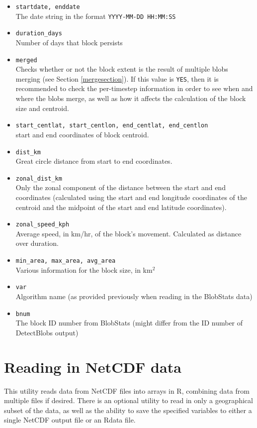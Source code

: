 \documentclass{article}
\begin{document}
\begin{itemize}
\item[]\texttt{startdate, enddate}\\The date string in the format \texttt{YYYY-MM-DD HH:MM:SS}
\item[] \texttt{duration\_days}\\ Number of days that block persists
\item[] \texttt{merged}\\ Checks whether or not the block extent is the result of multiple blobs merging (see Section \ref{mergesection}). If this value is \texttt{YES}, then it is recommended to check the per-timestep information in order to see when and where the blobs merge, as well as how it affects the calculation of the block size and centroid.
\item[] \texttt{start\_centlat, start\_centlon, end\_centlat, end\_centlon}\\ start and end coordinates of block centroid.
\item[] \texttt{dist\_km}\\ Great circle distance from start to end coordinates.
\item[] \texttt{zonal\_dist\_km} \\ Only the zonal component of the distance between the start and end coordinates (calculated using the start and end longitude coordinates of the centroid and the midpoint of the start and end latitude coordinates).
\item[] \texttt{zonal\_speed\_kph} \\Average speed, in km/hr, of the block's movement. Calculated as distance over duration.
\item[] \texttt{min\_area, max\_area, avg\_area} \\ Various information for the block size, in km$^2$
\item[] \texttt{var}\\Algorithm name (as provided previously when reading in the BlobStats data)
\item[] \texttt{bnum}\\ The block ID number from BlobStats (might differ from the ID number of DetectBlobs output)
\end{itemize}


\section{Reading in NetCDF data}

This utility reads data from NetCDF files into arrays in R, combining data from multiple files if desired. There is an optional utility to read in only a geographical subset of the data, as well as the ability to save the specified variables to either a single NetCDF output file or an Rdata file.
\end{document}
